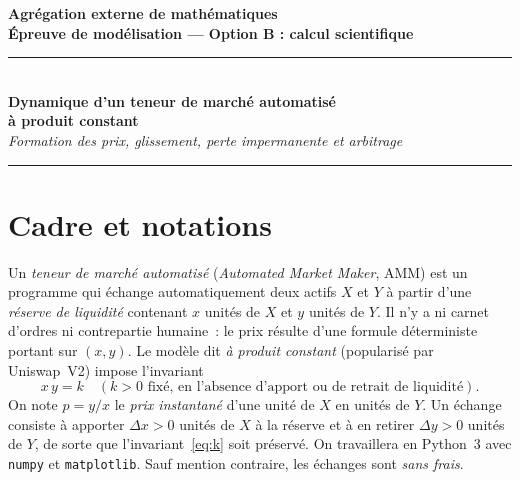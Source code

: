 \documentclass[11pt,a4paper]{article}
\begin{document}
\begin{center}
{\large\bfseries Agrégation externe de mathématiques}\\[3pt]
{\bfseries Épreuve de modélisation --- Option B : calcul scientifique}\\[10pt]
\rule{0.85\linewidth}{0.4pt}\\[8pt]
{\LARGE\bfseries Dynamique d'un teneur de marché automatisé\\[2pt] à produit constant}\\[6pt]
{\itshape Formation des prix, glissement, perte impermanente et arbitrage}\\[8pt]
\rule{0.85\linewidth}{0.4pt}
\end{center}

\medskip
\begin{center}
\end{center}

\bigskip
\section{Cadre et notations}

Un \emph{teneur de marché automatisé} (\emph{Automated Market Maker}, AMM) est un programme qui
échange automatiquement deux actifs $X$ et $Y$ à partir d'une \emph{réserve de liquidité}
contenant $x$ unités de $X$ et $y$ unités de $Y$. Il n'y a ni carnet d'ordres ni contrepartie
humaine~: le prix résulte d'une formule déterministe portant sur $(x,y)$. Le modèle dit
\emph{à produit constant} (popularisé par Uniswap~V2) impose l'invariant
\begin{equation}\label{eq:k}
  x\,y = k \quad (k>0 \text{ fixé, en l'absence d'apport ou de retrait de liquidité}).
\end{equation}
On note $p = y/x$ le \emph{prix instantané} d'une unité de $X$ en unités de $Y$. Un échange
consiste à apporter $\Delta x>0$ unités de $X$ à la réserve et à en retirer $\Delta y>0$ unités de
$Y$, de sorte que l'invariant~\eqref{eq:k} soit préservé. On travaillera en Python~3 avec
\texttt{numpy} et \texttt{matplotlib}. Sauf mention contraire, les échanges sont \emph{sans frais}.
\end{document}
